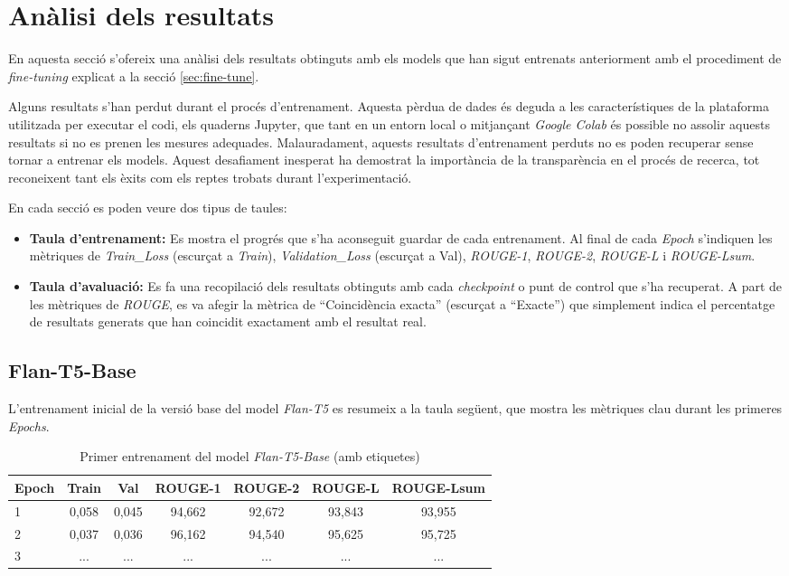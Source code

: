 \section{Anàlisi dels resultats}
En aquesta secció s'ofereix una anàlisi dels resultats obtinguts amb els models que han sigut entrenats anteriorment amb el procediment de \textit{fine-tuning} explicat a la secció \ref{sec:fine-tune}.

Alguns resultats s'han perdut durant el procés d'entrenament. Aquesta pèrdua de dades és deguda a les característiques de la plataforma utilitzada per executar el codi, els quaderns Jupyter, que tant en un entorn local o mitjançant \textit{Google Colab} és possible no assolir aquests resultats si no es prenen les mesures adequades. Malauradament, aquests resultats d'entrenament perduts no es poden recuperar sense tornar a entrenar els models. Aquest desafiament inesperat ha demostrat la importància de la transparència en el procés de recerca, tot reconeixent tant els èxits com els reptes trobats durant l'experimentació.

En cada secció es poden veure dos tipus de taules:
\begin{itemize}
    \item \textbf{Taula d'entrenament:} Es mostra el progrés que s'ha aconseguit guardar de cada entrenament. Al final de cada \textit{Epoch} s'indiquen les mètriques de \textit{Train\_Loss} (escurçat a \textit{Train}), \textit{Validation\_Loss} (escurçat a Val), \textit{ROUGE-1}, \textit{ROUGE-2}, \textit{ROUGE-L} i \textit{ROUGE-Lsum}.
    \item \textbf{Taula d'avaluació:} Es fa una recopilació dels resultats obtinguts amb cada \textit{checkpoint} o punt de control que s'ha recuperat. A part de les mètriques de \textit{ROUGE}, es va afegir la mètrica de ``Coincidència exacta'' (escurçat a ``Exacte'') que simplement indica el percentatge de resultats generats que han coincidit exactament amb el resultat real.
\end{itemize}

\subsection{Flan-T5-Base}
L'entrenament inicial de la versió base del model \textit{Flan-T5} es resumeix a la taula següent, que mostra les mètriques clau durant les primeres \textit{Epochs}. 

\begin{table}[H]
    \centering
    \begin{tabular}{lcccccc}
    \toprule
    Epoch & Train & Val & ROUGE-1 & ROUGE-2 & ROUGE-L & ROUGE-Lsum \\
    \midrule
    1 & 0,058 & 0,045 & 94,662 & 92,672 & 93,843 & 93,955 \\
    2 & 0,037 & 0,036 & 96,162 & 94,540 & 95,625 & 95,725 \\
    3 & ... & ... & ... & ... & ... & ... \\
    \bottomrule
    \end{tabular}
    \caption[Primer entrenament del model \textit{Flan-T5-Base}]{Primer entrenament del model \textit{Flan-T5-Base} (amb etiquetes)}
\end{table}

